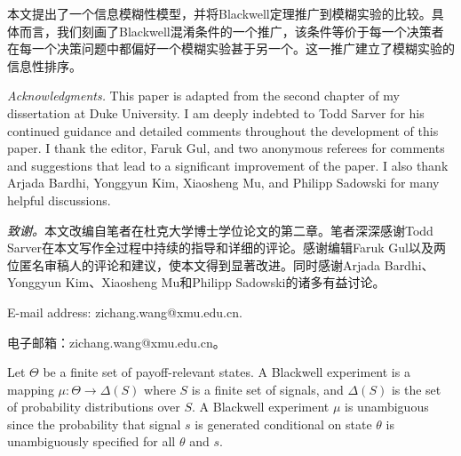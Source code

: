 \documentclass[12pt,a4paper]{article}
\newenvironment{original}
  {\par\vspace{4pt}\noindent\color{black}\ignorespaces}
  {\par\vspace{2pt}}
\newenvironment{translation}
  {\par\vspace{2pt}\noindent\color{myblue}\ignorespaces}
  {\par\vspace{6pt}}
\newcommand{\Delt}{\Delta}
\begin{document}
\begin{translation}
本文提出了一个信息模糊性模型，并将Blackwell定理推广到模糊实验的比较。具体而言，我们刻画了Blackwell混淆条件的一个推广，该条件等价于每一个决策者在每一个决策问题中都偏好一个模糊实验甚于另一个。这一推广建立了模糊实验的信息性排序。
\end{translation}

\begin{original}
\medskip
\noindent\textit{Acknowledgments.} This paper is adapted from the second chapter of my dissertation at Duke University. I am deeply indebted to Todd Sarver for his continued guidance and detailed comments throughout the development of this paper. I thank the editor, Faruk Gul, and two anonymous referees for comments and suggestions that lead to a significant improvement of the paper. I also thank Arjada Bardhi, Yonggyun Kim, Xiaosheng Mu, and Philipp Sadowski for many helpful discussions.
\end{original}

\begin{translation}
\textit{致谢。}本文改编自笔者在杜克大学博士学位论文的第二章。笔者深深感谢Todd Sarver在本文写作全过程中持续的指导和详细的评论。感谢编辑Faruk Gul以及两位匿名审稿人的评论和建议，使本文得到显著改进。同时感谢Arjada Bardhi、Yonggyun Kim、Xiaosheng Mu和Philipp Sadowski的诸多有益讨论。
\end{translation}

\begin{original}
E-mail address: zichang.wang@xmu.edu.cn.
\end{original}

\begin{translation}
电子邮箱：zichang.wang@xmu.edu.cn。
\end{translation}


\begin{original}
Let $\Theta$ be a finite set of payoff-relevant states. A Blackwell experiment is a mapping $\mu:\Theta\to\Delt(S)$ where $S$ is a finite set of signals, and $\Delt(S)$ is the set of probability distributions over $S$. A Blackwell experiment $\mu$ is unambiguous since the probability that signal $s$ is generated conditional on state $\theta$ is unambiguously specified for all $\theta$ and $s$.
\end{original}
\end{document}
